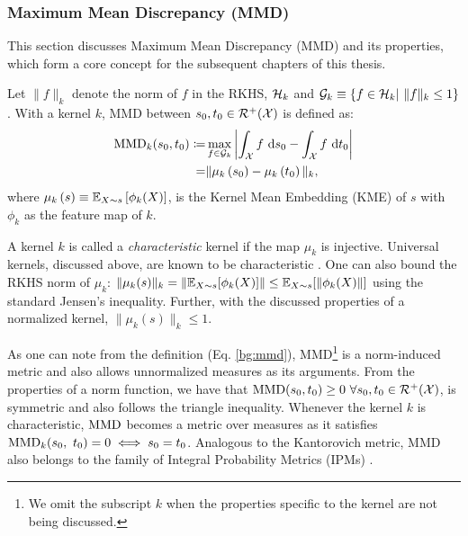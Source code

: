 \subsubsection{Maximum Mean Discrepancy (MMD)} This section discusses Maximum Mean Discrepancy (MMD) and its properties, which form a core concept for the subsequent chapters of this thesis.
\begin{definition}
Let $\|f\|_k$ denote the norm of $f$ in the RKHS, $\mathcal{H}_k$ and $\calG_k\equiv\left\{f\in\calH_k |\ \|f\|_k\le1\right\}$. With a kernel $k$, MMD between $s_0, t_0\in \mathcal{R}^+(\mathcal{X})$ is defined as:
\begin{align}\label{bg:mmd}
    \MMD_k(s_0,t_0)\coloneqq & \max\limits_{f\in\calG_k}\left|\int_\calX f\ \textup{d}s_0-\int_\calX f\ \textup{d}t_0\right|\nonumber\\
     =& \|\mu_k\left(s_0\right)-\mu_k\left(t_0\right)\|_k,
\end{align}
where $\mu_k\left(s\right)\equiv \mathbb{E}_{X\sim s}\left[\phi_k(X)\right]$, is the Kernel Mean Embedding (KME) of $s$ with $\phi_k$ as the feature map of $k$.    
\end{definition}
A kernel $k$ is called a \textit{characteristic} kernel if the map $\mu_k$ is injective. Universal kernels, discussed above, are known to be characteristic \citep{SriperumbudurFGSL2012}. One can also bound the RKHS norm of $\mu_k$: $\|\mu_k(s)\|_k= \|\mathbb{E}_{X\sim s}[\phi_k(X)]\|\leq \mathbb{E}_{X\sim s}[\| \phi_k(X) \|]$ using the standard Jensen's inequality. Further, with the discussed properties of a normalized kernel, $\|\mu_k(s)\|_k\leq 1$. 

As one can note from the definition (Eq. \ref{bg:mmd}), MMD\footnote{We omit the subscript $k$ when the properties specific to the kernel are not being discussed.} is a norm-induced metric and also allows unnormalized measures as its arguments. From the properties of a norm function, we have that $\textup{MMD}(s_0, t_0)\geq 0 \ \forall s_0,t_0\in \mathcal{R}^+(\mathcal{X})$, is symmetric and also follows the triangle inequality.
Whenever the kernel $k$ is characteristic, $\textup{MMD}$ becomes a metric over measures as it satisfies $\textup{MMD}_k(s_0,\ t_0)=0\iff s_0=t_0$. Analogous to the Kantorovich metric, MMD also belongs to the family of Integral Probability Metrics (IPMs) \citep{Sriperumbudur09onintegral}.

